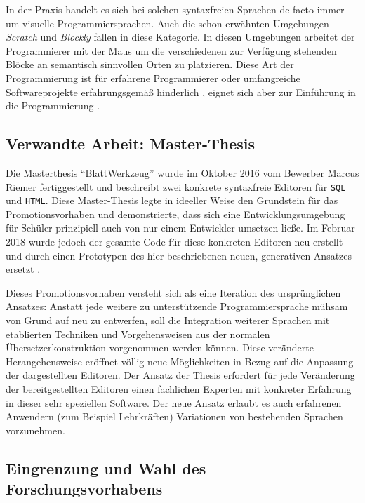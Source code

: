 \documentclass[paper=a4,fontsize=11pt,parskip=half]{scrartcl}
\begin{document}
In der Praxis handelt es sich bei solchen syntaxfreien Sprachen de facto immer um visuelle Programmiersprachen. Auch die schon erwähnten Umgebungen \textit{Scratch} und \textit{Blockly} fallen in diese Kategorie. In diesen Umgebungen arbeitet der Programmierer mit der Maus um die verschiedenen zur Verfügung stehenden Blöcke an semantisch sinnvollen Orten zu platzieren. Diese Art der Programmierung ist für erfahrene Programmierer oder umfangreiche Softwareprojekte erfahrungsgemäß hinderlich \cite[S. 262f]{schiffer_visuelle_2001}, eignet sich aber zur Einführung in die Programmierung \cite{resnick_scratch:_2009}.

\subsection{Verwandte Arbeit: Master-Thesis}

Die Masterthesis \enquote{BlattWerkzeug} \cite{riemer_blattwerkzeug_2016}  wurde im Oktober 2016 vom Bewerber Marcus Riemer fertiggestellt und beschreibt zwei konkrete syntaxfreie Editoren für \texttt{SQL} und \texttt{HTML}. Diese Master-Thesis legte in ideeller Weise den Grundstein für das Promotionsvorhaben und demonstrierte, dass sich eine Entwicklungsumgebung für Schüler prinzipiell auch von nur einem Entwickler umsetzen ließe. Im Februar 2018 wurde jedoch der gesamte Code für diese konkreten Editoren neu erstellt und durch einen Prototypen des hier beschriebenen neuen, generativen Ansatzes ersetzt \cite{riemer_commit_2018}.

Dieses Promotionsvorhaben versteht sich als eine Iteration des ursprünglichen Ansatzes: Anstatt jede weitere zu unterstützende Programmiersprache mühsam von Grund auf neu zu entwerfen, soll die Integration weiterer Sprachen mit etablierten Techniken und Vorgehensweisen aus der normalen Übersetzerkonstruktion vorgenommen werden können. Diese veränderte Herangehensweise eröffnet völlig neue Möglichkeiten in Bezug auf die Anpassung der dargestellten Editoren. Der Ansatz der Thesis erfordert für jede Veränderung der bereitgestellten Editoren einen fachlichen Experten mit konkreter Erfahrung in dieser sehr speziellen Software. Der neue Ansatz erlaubt es auch erfahrenen Anwendern (zum Beispiel Lehrkräften) Variationen von bestehenden Sprachen vorzunehmen.

\subsection{Eingrenzung und Wahl des Forschungsvorhabens}
\end{document}
